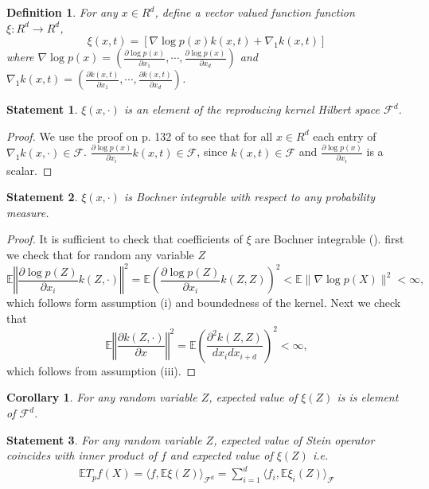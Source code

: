 \documentclass{article}
\newtheorem{definition}{Definition}
\newtheorem{statement}{Statement}
\newtheorem{corollary}{Corollary}
\newcommand{\ev}{\mathbb{E}}
\begin{document}
\begin{definition}
For any $x \in R^d$, define a vector valued function function  $\xi: R^d \to R^d$,
\[
 \xi(x,t) =\left[ \nabla \log p(x) k(x,t)+\nabla_1 k(x,t)\right]
\] 
where $\nabla \log p(x) = \left( \frac{\partial \log p(x)}{ \partial x_1}, \cdots , \frac{\partial \log p(x)}{ \partial x_d} \right)$ and 
$  \nabla_1 k(x,t) = \left( \frac{\partial k(x,t)}{ \partial x_1}, \cdots , \frac{\partial  k(x,t)}{ \partial x_d} \right)$. 
\end{definition}

\begin{statement}
\label{lem:WellDefined}
 $\xi(x,\cdot)$ is an element of the reproducing kernel Hilbert space $\mathcal{F}^d$.
\end{statement}
\begin{proof}
 We use the proof on p. 132 of \cite[Corollary 4.36]{SteChr08} to see that for all $x \in R^d$ each entry of $\nabla_1 k(x,\cdot)\in\mathcal{F}$. $\frac{\partial \log p(x)}{ \partial x_i} k(x,t) \in\mathcal{F}$, since $k(x,t) \in\mathcal{F}$ and $\frac{\partial \log p(x)}{ \partial x_i}$ is a scalar. 
\end{proof}


\begin{statement}
\label{lem:BochnerInt}
$\xi(x,\cdot)$ is Bochner integrable with respect to any probability measure.
\end{statement}

\begin{proof}
It is sufficient to check that coefficients of $\xi$ are Bochner integrable  (\cite[Definition A.5.20]{SteChr08}). first we check that for random any variable $Z$
\[
\ev \left\Vert \frac{\partial \log p(Z) }{\partial x_i} k(Z,\cdot)\right\Vert^2 = \ev \left( \frac{\partial \log p(Z) }{\partial x_i} k(Z,Z) \right)^2 <\ev   \| \nabla \log p(X) \|^2 <\infty,
\]
which follows form assumption (i) and boundedness of the kernel. Next we check that 
\[
\ev \left\Vert \frac{\partial k(Z,\cdot)}{\partial x}\right\Vert^2 =\ev \left(\frac{\partial^{2} k(Z,Z) }{dx_i dx_{i+d} }\right)^2<\infty,
\]
which follows from assumption (iii). 
\end{proof}

\begin{corollary}
 For any random variable $Z$, expected value of $\xi(Z)$ is is element of $\mathcal{F}^d$.
\end{corollary}


\begin{statement}
For any random variable $Z$, expected value of Stein operator coincides with inner product of $f$ and expected value of $\xi(Z)$ i.e. 
\begin{align}
\ev T_{p} f(X) = \langle f ,\ev \xi(Z) \rangle_{\mathcal{F}^d}  =\sum_{i=1}^d \langle f_i, \ev \xi_i(Z) \rangle_{\mathcal{F}}
\end{align}
\end{statement}
\end{document}
